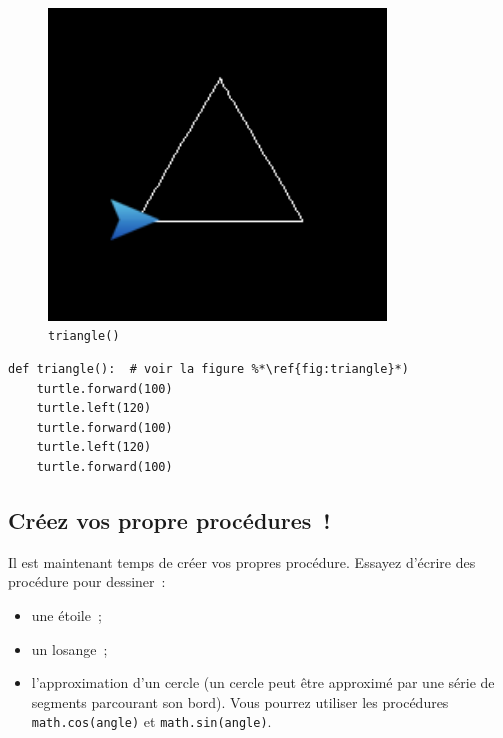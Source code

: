 \documentclass[11pt,a4paper]{article}
\begin{document}
\begin{figure}
    \centering
    \includegraphics[width=0.8\textwidth]{img/triangle}
    \caption{\lstinline{triangle()}}
    \label{fig:triangle}
\end{figure}

\begin{lstlisting}[float]
def triangle():  # voir la figure %*\ref{fig:triangle}*)
    turtle.forward(100)
    turtle.left(120)
    turtle.forward(100)
    turtle.left(120)
    turtle.forward(100)
\end{lstlisting}

\subsection{Créez vos propre procédures~!}

Il est maintenant temps de créer vos propres procédure. Essayez d'écrire des
procédure pour dessiner~:

\begin{itemize}
    \item une étoile~;
    \item un losange~;
    \item l'approximation d'un cercle (un cercle peut être approximé par une
        série de segments parcourant son bord). Vous pourrez utiliser les
        procédures \lstinline{math.cos(angle)} et \lstinline{math.sin(angle)}.
\end{itemize}
\end{document}
